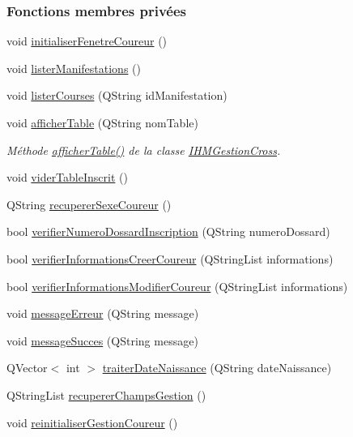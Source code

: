 \subsubsection*{Fonctions membres privées}
\begin{DoxyCompactItemize}
\item 
void \hyperlink{class_i_h_m_gestion_cross_aa5d9de499a66e52b843c4ef4c6074a60}{initialiser\+Fenetre\+Coureur} ()
\item 
void \hyperlink{class_i_h_m_gestion_cross_a0eadd8592c966c89bf7b5a25a0ae7589}{lister\+Manifestations} ()
\item 
void \hyperlink{class_i_h_m_gestion_cross_a34567afe3e94862ebd9af51528dedb65}{lister\+Courses} (Q\+String id\+Manifestation)
\item 
void \hyperlink{class_i_h_m_gestion_cross_ae1510779a1efa3defecb517467e84f91}{afficher\+Table} (Q\+String nom\+Table)
\begin{DoxyCompactList}\small\item\em Méthode \hyperlink{class_i_h_m_gestion_cross_ae1510779a1efa3defecb517467e84f91}{afficher\+Table()} de la classe \hyperlink{class_i_h_m_gestion_cross}{I\+H\+M\+Gestion\+Cross}. \end{DoxyCompactList}\item 
void \hyperlink{class_i_h_m_gestion_cross_ac1ca02b1cb49d9c2f60785c8bd441d60}{vider\+Table\+Inscrit} ()
\item 
Q\+String \hyperlink{class_i_h_m_gestion_cross_a7e1cdc8b3b01f2f2f666f80bf1cc9f5a}{recuperer\+Sexe\+Coureur} ()
\item 
bool \hyperlink{class_i_h_m_gestion_cross_a164be2d046cf18ee03e3939d03a5580d}{verifier\+Numero\+Dossard\+Inscription} (Q\+String numero\+Dossard)
\item 
bool \hyperlink{class_i_h_m_gestion_cross_ae08eec25f5a6d33bf133b0cee78c7c5c}{verifier\+Informations\+Creer\+Coureur} (Q\+String\+List informations)
\item 
bool \hyperlink{class_i_h_m_gestion_cross_a0e088653019d8adefb371348f272d2e2}{verifier\+Informations\+Modifier\+Coureur} (Q\+String\+List informations)
\item 
void \hyperlink{class_i_h_m_gestion_cross_a92fa6016b00d2d4429c901e77d37bf10}{message\+Erreur} (Q\+String message)
\item 
void \hyperlink{class_i_h_m_gestion_cross_a71412d0c3e1d059a646c755803077a7b}{message\+Succes} (Q\+String message)
\item 
Q\+Vector$<$ int $>$ \hyperlink{class_i_h_m_gestion_cross_a4846dcb0c5f95b2b774ab328654bf716}{traiter\+Date\+Naissance} (Q\+String date\+Naissance)
\item 
Q\+String\+List \hyperlink{class_i_h_m_gestion_cross_a271efe8d31fbe05fccfb2dc81e71971a}{recuperer\+Champs\+Gestion} ()
\item 
void \hyperlink{class_i_h_m_gestion_cross_a85c44933ec0dcbb591e01c832063367e}{reinitialiser\+Gestion\+Coureur} ()
\end{DoxyCompactItemize}
